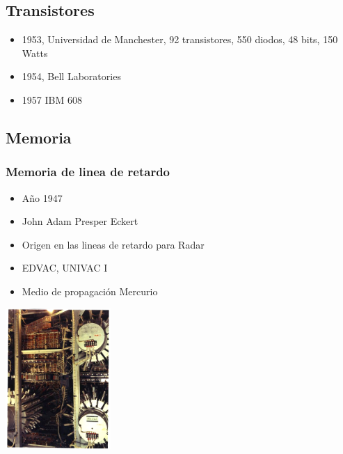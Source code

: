 \documentclass{beamer}
\begin{document}
\subsection{Transistores}
\begin{frame}
	\begin{itemize}
		\item 1953, Universidad de Manchester, 92 transistores, 550 diodos, 48 bits, 150 Watts
		\item 1954, Bell Laboratories
		\item 1957 IBM 608
	\end{itemize}
\end{frame}

\subsection{Memoria}
\begin{frame}
\frametitle{Memoria de linea de retardo}
\begin{minipage}[c]{7.5cm}
	\begin{itemize}
		\item Año 1947
		\item John Adam Presper Eckert
		\item Origen en las lineas de retardo para Radar
		\item EDVAC, UNIVAC I
		\item Medio de propagación Mercurio
	\end{itemize}
\end{minipage}
\begin{minipage}[c]{4cm}
	\begin{center}
		\includegraphics[width=4cm]{delay_line.png}
	\end{center}
\end{minipage}
\end{frame}
\end{document}
